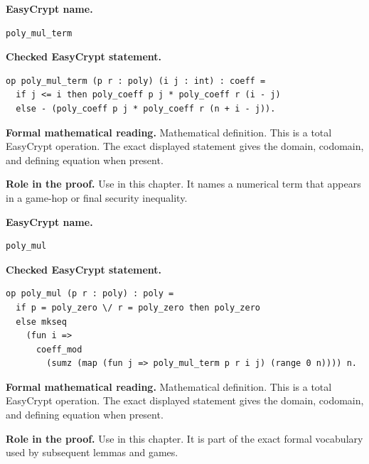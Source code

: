 \begin{formaldefinition}
\noindent\textbf{EasyCrypt name.}
\begin{lstlisting}[language=EasyCrypt,basicstyle=\ttfamily\scriptsize]
poly_mul_term
\end{lstlisting}
\noindent\textbf{Checked EasyCrypt statement.}
\begin{lstlisting}[language=EasyCrypt,basicstyle=\ttfamily\scriptsize]
op poly_mul_term (p r : poly) (i j : int) : coeff =
  if j <= i then poly_coeff p j * poly_coeff r (i - j)
  else - (poly_coeff p j * poly_coeff r (n + i - j)).
\end{lstlisting}
\noindent\textbf{Formal mathematical reading.}
Mathematical definition. This is a total EasyCrypt operation.  The exact displayed statement gives the domain, codomain, and defining equation when present.

\noindent\textbf{Role in the proof.}
Use in this chapter. It names a numerical term that appears in a game-hop or final security inequality.

\end{formaldefinition}

\begin{formaldefinition}
\noindent\textbf{EasyCrypt name.}
\begin{lstlisting}[language=EasyCrypt,basicstyle=\ttfamily\scriptsize]
poly_mul
\end{lstlisting}
\noindent\textbf{Checked EasyCrypt statement.}
\begin{lstlisting}[language=EasyCrypt,basicstyle=\ttfamily\scriptsize]
op poly_mul (p r : poly) : poly =
  if p = poly_zero \/ r = poly_zero then poly_zero
  else mkseq
    (fun i =>
      coeff_mod
        (sumz (map (fun j => poly_mul_term p r i j) (range 0 n)))) n.
\end{lstlisting}
\noindent\textbf{Formal mathematical reading.}
Mathematical definition. This is a total EasyCrypt operation.  The exact displayed statement gives the domain, codomain, and defining equation when present.

\noindent\textbf{Role in the proof.}
Use in this chapter. It is part of the exact formal vocabulary used by subsequent lemmas and games.

\end{formaldefinition}

